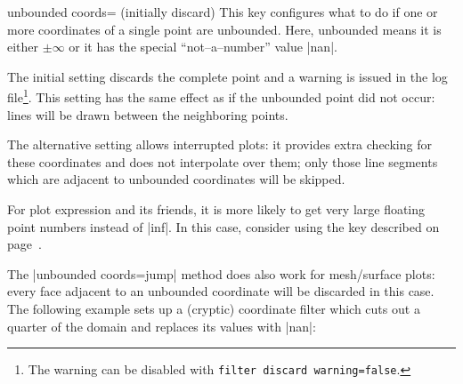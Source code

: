 \begin{pgfplotskey}{unbounded coords= (initially discard)}
	This key configures what to do if one or more coordinates of a single point are unbounded. Here, unbounded means it is either $\pm \infty$ or it has the special ``not--a--number'' value |nan|.

	The initial setting  discards the complete point and a warning is issued in the log file\footnote{The warning can be disabled with \texttt{filter discard warning=false}.}. This setting has the same effect as if the unbounded point did not occur: lines will be drawn between the neighboring points.

	The alternative setting  allows interrupted plots: it provides extra checking for these coordinates and does not interpolate over them; only those line segments which are adjacent to unbounded coordinates will be skipped. 
\begin{codeexample}[]
\end{codeexample}

	For plot expression and its friends, it is more likely to get very large floating point numbers instead of |inf|. In this case, consider using the  key described on page~\pageref{key:restrict:x:to:domain}.

	The |unbounded coords=jump| method does also work for mesh/surface plots: every face adjacent to an unbounded coordinate will be discarded in this case. The following example sets up a (cryptic) coordinate filter which cuts out a quarter of the domain and replaces its values with |nan|:


\end{pgfplotskey}
